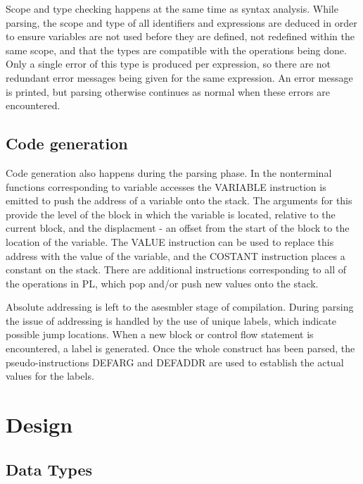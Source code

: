 \documentclass{article}
\begin{document}
Scope and type checking happens at the same time as syntax analysis. While parsing, the scope and type of all identifiers and expressions are deduced in order to ensure variables are not used before they are defined, not redefined within the same scope, and that the types are compatible with the operations being done. Only a single error of this type is produced per expression, so there are not redundant error messages being given for the same expression. An error message is printed, but parsing otherwise continues as normal when these errors are encountered.

\subsection{Code generation}

Code generation also happens during the parsing phase. In the nonterminal functions corresponding to variable accesses the VARIABLE instruction is emitted to push the address of a variable onto the stack. The arguments for this provide the level of the block in which the variable is located, relative to the current block, and the displacment - an offset from the start of the block to the location of the variable. The VALUE instruction can be used to replace this address with the value of the variable, and the COSTANT instruction places a constant on the stack. There are additional instructions corresponding to all of the operations in PL, which pop and/or push new values onto the stack.

Absolute addressing is left to the asesmbler stage of compilation. During parsing the issue of addressing is handled by the use of unique labels, which indicate possible jump locations. When a new block or control flow statement is encountered, a label is generated. Once the whole construct has been parsed, the pseudo-instructions DEFARG and DEFADDR are used to establish the actual values for the labels.

\section{Design}

\subsection*{Data Types}
\end{document}
